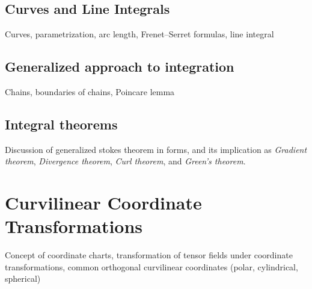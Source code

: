 \section{Curves and Line Integrals}
Curves, parametrization, arc length, Frenet–Serret formulas, line integral
\section{Generalized approach to integration}
Chains, boundaries of chains, Poincare lemma
\section{Integral theorems}
Discussion of generalized stokes theorem in forms, and its implication as \emph{Gradient theorem}, \emph{Divergence theorem}, \emph{Curl theorem}, and \emph{Green's theorem}.

\chapter{Curvilinear Coordinate Transformations}
Concept of coordinate charts, transformation of tensor fields under coordinate transformations, common orthogonal curvilinear coordinates (polar, cylindrical, spherical)
